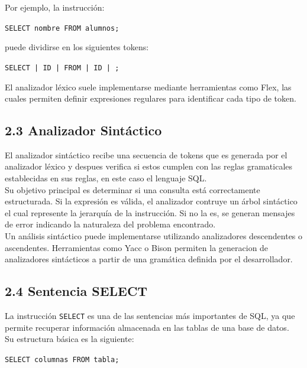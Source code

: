 \documentclass{article}
\begin{document}
Por ejemplo, la instrucción:

\begin{center}
\texttt{SELECT nombre FROM alumnos;}
\end{center}

puede dividirse en los siguientes tokens:

\begin{center}
\texttt{SELECT | ID | FROM | ID | ;}
\end{center}

El analizador léxico suele implementarse mediante herramientas como Flex, las cuales permiten definir expresiones regulares para identificar cada tipo de token.

\subsection{2.3 Analizador Sintáctico}

El analizador sintáctico recibe una secuencia de tokens que es generada por el analizador léxico y despues verifica si estos cumplen con las reglas gramaticales establecidas en sus reglas, en este caso el lenguaje SQL. \\

Su objetivo principal es determinar si una consulta está correctamente estructurada. Si la expresión es válida, el analizador contruye un árbol sintáctico el cual  represente la jerarquía de la instrucción. Si no la es, se generan mensajes de error indicando la naturaleza del problema encontrado. \\

Un análisis sintáctico puede implementarse utilizando analizadores descendentes o ascendentes. Herramientas como Yacc o Bison permiten la generacion de analizadores sintácticos a partir de una gramática definida por el desarrollador.

\subsection{2.4 Sentencia SELECT}

La instrucción \texttt{SELECT} es una de las sentencias más importantes de SQL, ya que permite recuperar información almacenada en las tablas de una base de datos. \\

Su estructura básica es la siguiente:

\begin{center}
\texttt{SELECT columnas FROM tabla;}
\end{center}
\end{document}
